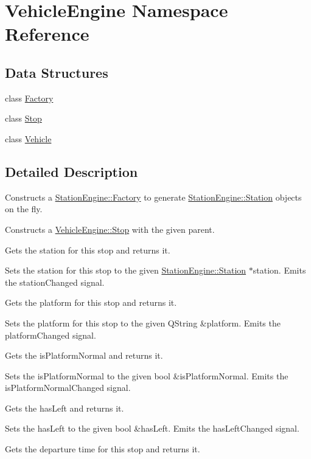 \hypertarget{namespaceVehicleEngine}{}\section{Vehicle\+Engine Namespace Reference}
\label{namespaceVehicleEngine}
\subsection*{Data Structures}
\begin{DoxyCompactItemize}
\item 
class \mbox{\hyperlink{classVehicleEngine_1_1Factory}{Factory}}
\item 
class \mbox{\hyperlink{classVehicleEngine_1_1Stop}{Stop}}
\item 
class \mbox{\hyperlink{classVehicleEngine_1_1Vehicle}{Vehicle}}
\end{DoxyCompactItemize}


\subsection{Detailed Description}
Constructs a \mbox{\hyperlink{classStationEngine_1_1Factory}{Station\+Engine\+::\+Factory}} to generate \mbox{\hyperlink{classStationEngine_1_1Station}{Station\+Engine\+::\+Station}} objects on the fly.

Constructs a \mbox{\hyperlink{classVehicleEngine_1_1Stop}{Vehicle\+Engine\+::\+Stop}} with the given parent.

Gets the station for this stop and returns it.

Sets the station for this stop to the given \mbox{\hyperlink{classStationEngine_1_1Station}{Station\+Engine\+::\+Station}} $\ast$station. Emits the station\+Changed signal.

Gets the platform for this stop and returns it.

Sets the platform for this stop to the given Q\+String \&platform. Emits the platform\+Changed signal.

Gets the is\+Platform\+Normal and returns it.

Sets the is\+Platform\+Normal to the given bool \&is\+Platform\+Normal. Emits the is\+Platform\+Normal\+Changed signal.

Gets the has\+Left and returns it.

Sets the has\+Left to the given bool \&has\+Left. Emits the has\+Left\+Changed signal.

Gets the departure time for this stop and returns it.

